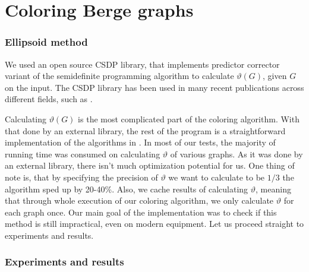 

\section{Coloring Berge graphs}

\subsubsection{Ellipsoid method}

We used an open source CSDP \cite{csdpRepo, csdp1999} library, that implements predictor corrector variant of the semidefinite programming algorithm to calculate $\vartheta(G)$, given $G$ on the input. The CSDP library has been used in many recent publications across different fields, such as \cite{Ampountolas_2017, Adasme_2011}.

Calculating $\vartheta(G)$ is the most complicated part of the coloring algorithm. With that done by an external library, the rest of the program is a straightforward implementation of the algorithms in . In most of our tests, the majority of running time was consumed on calculating $\vartheta$ of various graphs. As it was done by an external library, there isn't much optimization potential for us. One thing of note is, that by specifying the precision of $\vartheta$ we want to calculate to be $1/3$ the algorithm sped up  by 20-40\%. Also, we cache results of calculating $\vartheta$, meaning that through whole execution of our coloring algorithm, we only calculate $\vartheta$ for each graph once. Our main goal of the implementation was to check if this method is still impractical, even on modern equipment. Let us proceed straight to experiments and results.

\subsubsection{Experiments and results}


